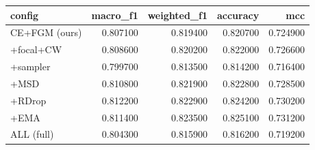 \begin{tabular}{lrrrr}
\toprule
config & macro\_f1 & weighted\_f1 & accuracy & mcc \\
\midrule
CE+FGM (ours) & 0.807100 & 0.819400 & 0.820700 & 0.724900 \\
+focal+CW & 0.808600 & 0.820200 & 0.822000 & 0.726600 \\
+sampler & 0.799700 & 0.813500 & 0.814200 & 0.716400 \\
+MSD & 0.810800 & 0.821900 & 0.822800 & 0.728500 \\
+RDrop & 0.812200 & 0.822900 & 0.824200 & 0.730200 \\
+EMA & 0.811400 & 0.823500 & 0.825100 & 0.731200 \\
ALL (full) & 0.804300 & 0.815900 & 0.816200 & 0.719200 \\
\bottomrule
\end{tabular}
